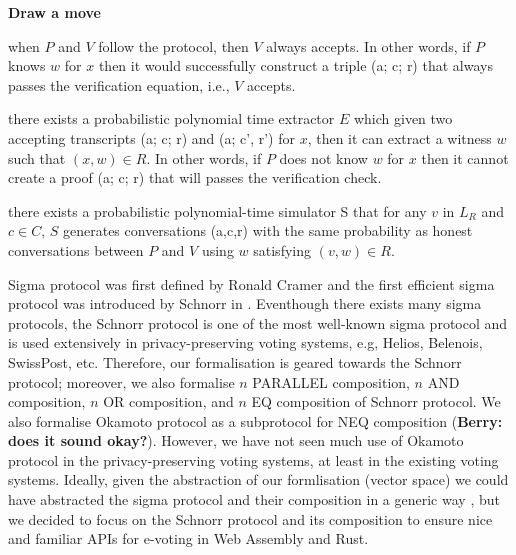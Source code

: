 \documentclass[sigconf]{acmart}
\begin{document}
\textbf{Draw a move }


when $P$ and $V$ follow the protocol, then $V$ always accepts. In other words, 
if $P$ knows $w$ for $x$ then it would successfully construct a triple 
(a; c; r) that always passes the verification equation, i.e., $V$ accepts.   

there exists a probabilistic polynomial time extractor $E$ which given 
two accepting transcripts (a; c; r) and (a; c', r') for $x$, then 
it can extract a witness $w$ such that $(x, w) \in R$. In other words, 
if $P$ does not know $w$ for $x$ then it cannot create a proof 
(a; c; r) that will passes the verification check. 

there exists a probabilistic polynomial-time simulator S that for  
any $v$ in $L_R$ and $c \in C$, $S$ generates conversations 
(a,c,r) with the same probability as honest conversations between 
$P$ and $V$ using $w$ satisfying $(v,w) \in R$.






Sigma protocol was first defined by Ronald Cramer \cite{cramer1996modular} 
and the first efficient sigma protocol was introduced by Schnorr in \cite{schnorr1991efficient}. 
Eventhough there exists many sigma protocols, the Schnorr protocol is one of the most well-known
sigma protocol and is used extensively in privacy-preserving voting systems, e.g, Helios, 
Belenois, SwissPost, etc. Therefore, our formalisation is geared towards the Schnorr protocol; moreover, we 
also formalise $n$ PARALLEL composition, $n$ AND composition, $n$ OR composition, 
and $n$ EQ composition of Schnorr protocol. We also formalise Okamoto protocol as a subprotocol 
for NEQ composition (\textbf{Berry: does it sound okay?}). However, we have not seen 
much use of Okamoto protocol in the privacy-preserving voting systems, 
at least in the existing voting systems. Ideally, given the abstraction of 
our formlisation (vector space) we could have abstracted the 
sigma protocol and their composition in a generic way \cite{10.1007/978-3-642-02384-2_17},
but we decided to focus on the Schnorr protocol and its composition to ensure nice and familiar APIs 
for e-voting in Web Assembly and Rust.
\end{document}
